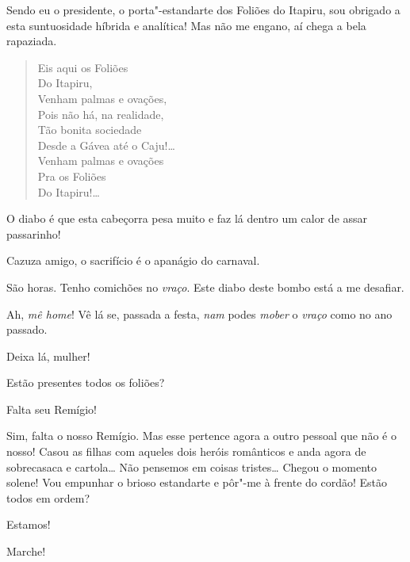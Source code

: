  Sendo eu o presidente, o porta"-estandarte dos
Foliões do Itapiru, sou obrigado a esta suntuosidade híbrida e
analítica! Mas não me engano, aí chega a bela rapaziada.


\begin{verse}
Eis aqui os Foliões\\
\quad Do Itapiru,\\
Venham palmas e ovações,\\
Pois não há, na realidade,\\
Tão bonita sociedade\\
Desde a Gávea até o Caju!\ldots{}\\
Venham palmas e ovações\\
\quad Pra os Foliões\\
\quad Do Itapiru!\ldots{}
\end{verse}

  O diabo é que esta cabeçorra
pesa muito e faz lá dentro um calor de assar passarinho!

 Cazuza amigo, o sacrifício é o apanágio do carnaval.

 São horas. Tenho comichões no \textit{vraço}.  Este diabo deste bombo está a
me desafiar.

 Ah, \textit{mê home}! Vê lá se, passada a festa,
\textit{nam} podes \textit{mober} o \textit{vraço} como no ano passado.

 Deixa lá, mulher!

 Estão presentes todos os foliões?

 Falta seu Remígio!

 Sim, falta o nosso Remígio. Mas esse pertence agora a
outro pessoal que não é o nosso! Casou as filhas com aqueles dois heróis
românticos e anda agora de sobrecasaca e cartola\ldots{} Não pensemos em coisas
tristes\ldots{}  Chegou o momento solene! Vou
empunhar o brioso estandarte e 
pôr"-me à frente do cordão! Estão todos em ordem?

 Estamos!

 Marche!  


